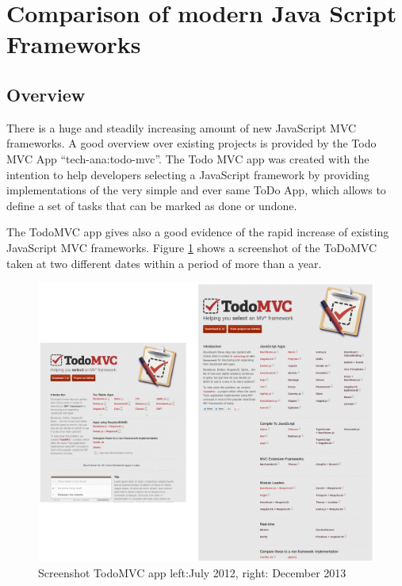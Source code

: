 \section{Comparison of modern Java Script Frameworks}

\subsection{Overview}

There is a huge and steadily increasing amount of new JavaScript MVC frameworks.
A good overview over existing projects is provided by the Todo MVC App \enquote{tech-ana:todo-mvc}.
The Todo MVC app was created with the intention to help developers selecting a JavaScript framework by providing implementations of the very simple and ever same ToDo App, which allows to define a set of tasks that can be marked as done or undone.


The TodoMVC app gives also a good evidence of the rapid increase of existing JavaScript MVC frameworks.
Figure \ref{fig:todoMvcComp} shows a screenshot of the ToDoMVC taken at two different dates within a period of more than a year.

\begin{figure}
	\centering	\includegraphics[width=1.0\textwidth]{./img/tech-ana/todo_mvc_app_comparison.png}
	\caption{Screenshot TodoMVC app left:July 2012, right: December 2013}
	\label{fig:todoMvcComp}
\end{figure}


